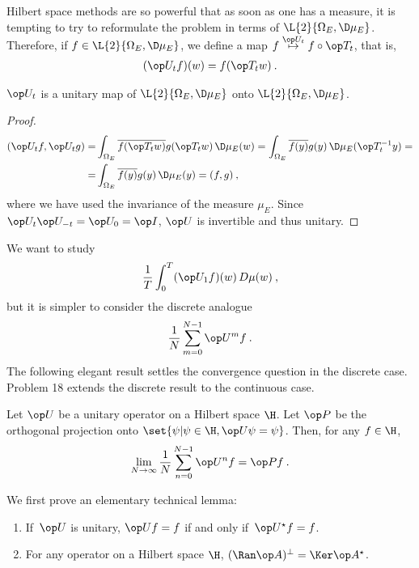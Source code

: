 Hilbert space methods are so powerful that as soon as one has a measure, it is tempting to try to reformulate the problem in terms of $\L{2}{\Omega_E, \D \mu_E}$.
Therefore, if $f \in \L{2}{\Omega_E, \D \mu_E}$, we define a map $f \overset{\op U_t}\mapsto f \circ \op T_t$, that is, \begin{align}
    (\op U_t f)(w) = f(\op T_t w) \:.
\end{align}

\begin{lemma}
    $\op U_t$ is a unitary map of $\L{2}{\Omega_E, \D \mu_E}$ onto $\L{2}{\Omega_E, \D \mu_E}$.
\end{lemma}
\begin{proof}
    \begin{align}
        (\op U_t f, \op U_t g) =&
         \int_{\Omega_E} \overline{f(\op T_t w)} g(\op T_t w) \, \D \mu_E (w) =
         \int_{\Omega_E} \overline{f(y)} g(y) \, \D \mu_E (\op T_t^{-1} y) = \\ =&
         \int_{\Omega_E} \overline{f(y)} g(y) \, \D \mu_E (y) = (f,g) \:, \nonumber
    \end{align}
    where we have used the invariance of the measure $\mu_E$. Since $\op U_t \op U_{-t} = \op U_0 = \op I$, $\op U$ is invertible and thus unitary.
\end{proof}

We want to study
\begin{align}
    \frac{1}{T} \int_0^T (\op U_1 f)(w) \, D \mu(w) \:,
\end{align}
but it is simpler to consider the discrete analogue \begin{align}
    \frac{1}{N} \sum_{m=0}^{N-1} \op U^m f \:.
\end{align}
The following elegant result settles the convergence question in the discrete case. Problem 18 extends the discrete result to the continuous case.

\begin{theorem}
Let $\op U$ be a unitary operator on a Hilbert space $\H$. Let $\op P$ be the orthogonal projection onto $\set{\psi | \psi \in \H, \op U \psi = \psi}$. Then, for any $f \in \H$,
\begin{align}
    \lim_{N \rightarrow \infty} \frac{1}{N} \sum_{n=0}^{N-1} \op U^n f = \op P f \:. 
\end{align}
\end{theorem}

We first prove an elementary technical lemma:
\begin{lemma}
    \begin{enumerate}
        \item If \,$\op U$ is unitary, $\op U f = f$ if and only if \,$\op U^\star f = f$.
        \item For any operator on a Hilbert space $\H$, $(\Ran \op A)^\bot = \Ker \op A^\star$.
    \end{enumerate}
\end{lemma}

